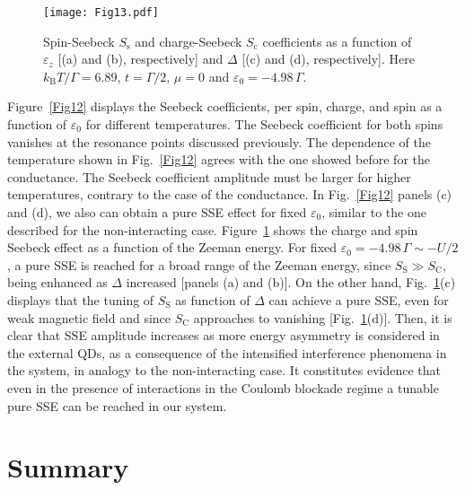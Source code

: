 \documentclass[aps,twocolumn,prb,superscript,floatfix,superscriptaddress,showpacs]{revtex4-1}
\newcommand{\ve}{\varepsilon}
\begin{document}
\begin{figure}[tbph]
\centering
\texttt{[image: Fig13.pdf]}
\caption{Spin-Seebeck $S_{\text{s}}$ and charge-Seebeck $S_{\text{c}}$ coefficients as a function of $\ve_{z}$ [(a) and (b), respectively] and $\Delta$ [(c) and (d), respectively]. Here $k_{\text{B}}T/\Gamma=6.89$, $t=\Gamma/2$, $\mu=0$ and $\ve_0=-4.98\,\Gamma$.}
\label{Fig13}
\end{figure}

Figure\ \ref{Fig12} displays the Seebeck coefficients, per spin, charge, and spin as a function of $\ve_{0}$ for different temperatures. The Seebeck coefficient for both spins vanishes at the resonance points discussed previously. The dependence of the temperature shown in Fig.\ \ref{Fig12} agrees with the one showed before for the conductance. The Seebeck coefficient amplitude must be larger for higher temperatures, contrary to the case of the conductance. In  Fig.\ \ref{Fig12} panels (c) and (d), we also can obtain a pure SSE effect for fixed $\ve_0$, similar to the one described for the non-interacting case. Figure\ \ref{Fig13} shows the charge and spin Seebeck effect as a function of the Zeeman energy. For fixed  $\ve_{0}=-4.98\,\Gamma\sim -U/2$, a pure SSE is reached for a broad range of the Zeeman energy, since $S_{\text{S}}\gg S_{\text{C}}$, being enhanced as $\Delta$ increased [panels (a) and (b)]. On the other hand, Fig.\ \ref{Fig13}(c) displays that the tuning of $S_{\text{S}}$ as function of $\Delta$ can achieve a pure SSE, even for weak magnetic field and since $S_{\text{C}}$ approaches to vanishing [Fig.\ \ref{Fig13}(d)]. Then, it is clear that SSE amplitude increases as more energy asymmetry is considered in the external QDs, as a consequence of the intensified interference phenomena in the system, in analogy to the non-interacting case. It constitutes evidence that even in the presence of interactions in the Coulomb blockade regime a  tunable pure SSE can be reached in our system.  

\section{Summary}\label{secconclu}
\end{document}

